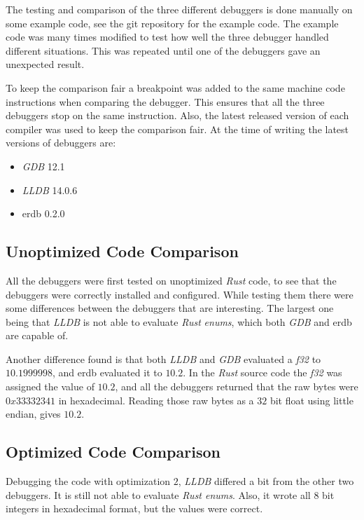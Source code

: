 The testing and comparison of the three different debuggers is done manually on some example code, see the git repository \cite{example-code} for the example code.
The example code was many times modified to test how well the three debugger handled different situations.
This was repeated until one of the debuggers gave an unexpected result.


To keep the comparison fair a breakpoint was added to the same machine code instructions when comparing the debugger.
This ensures that all the three debuggers stop on the same instruction.
Also, the latest released version of each compiler was used to keep the comparison fair.
At the time of writing the latest versions of debuggers are:

\begin{itemize}
    \item \emph{GDB} 12.1
    \item \emph{LLDB} 14.0.6
    \item \gls{erdb} 0.2.0 %
\end{itemize}




\subsection{Unoptimized Code Comparison}
All the debuggers were first tested on unoptimized \emph{Rust} code, to see that the debuggers were correctly installed and configured.
While testing them there were some differences between the debuggers that are interesting.
The largest one being that \emph{LLDB} is not able to evaluate \emph{Rust} \emph{enums}, which both \emph{GDB} and \gls{erdb} are capable of.


Another difference found is that both \emph{LLDB} and \emph{GDB} evaluated a \emph{f32} to $10.1999998$, and \gls{erdb} evaluated it to $10.2$.
In the \emph{Rust} source code the \emph{f32} was assigned the value of $10.2$, and all the debuggers returned that the raw bytes were $0x33332341$ in hexadecimal.
Reading those raw bytes as a $32$ bit float using little endian, gives $10.2$.



\subsection{Optimized Code Comparison} %
Debugging the code with optimization $2$, \emph{LLDB} differed a bit from the other two debuggers.
It is still not able to evaluate \emph{Rust enums}.
Also, it wrote all $8$ bit integers in hexadecimal format, but the values were correct.


